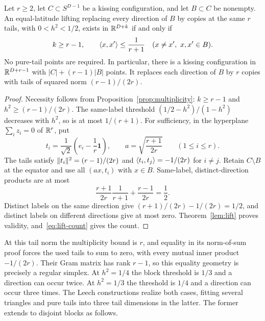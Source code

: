 \begin{proposition}\label{prop:simplex}
Let $r\ge2$, let $C\subset S^{D-1}$ be a kissing configuration, and
let $B\subset C$ be nonempty. An equal-latitude lifting replacing
every direction of $B$ by copies at the same $r$ tails, with
$0<h^2<1/2$, exists in $\mathbb R^{D+k}$ if and only if
\[
 k\ge r-1,\qquad
 \langle x,x'\rangle\le\frac1{r+1}\quad(x\ne x',\ x,x'\in B).
\]
No pure-tail points are required. In particular, there is a kissing
configuration in $\mathbb R^{D+r-1}$ with
$|C|+(r-1)|B|$ points. It replaces each direction of $B$ by $r$
copies with tails of squared norm $(r-1)/(2r)$.
\end{proposition}
\begin{proof}
Necessity follows from Proposition~\ref{prop:multiplicity}:
$k\ge r-1$ and $h^2\ge(r-1)/(2r)$. The same-label threshold
$(1/2-h^2)/(1-h^2)$ decreases with $h^2$, so is at most $1/(r+1)$.
For sufficiency, in the hyperplane $\sum_i z_i=0$ of $\mathbb R^r$, put
\[
 t_i=\frac1{\sqrt2}\left(e_i-\frac1r\boldsymbol1\right),
 \qquad a=\sqrt{\frac{r+1}{2r}}\qquad(1\le i\le r).
\]
The tails satisfy $\lVert t_i\rVert^2=(r-1)/(2r)$ and
$\langle t_i,t_j\rangle=-1/(2r)$ for $i\ne j$. Retain $C\setminus B$
at the equator and use all $(ax,t_i)$ with $x\in B$.
Same-label, distinct-direction products are at most
\[
 \frac{r+1}{2r}\frac1{r+1}+\frac{r-1}{2r}=\frac12.
\]
Distinct labels on the same direction give
$(r+1)/(2r)-1/(2r)=1/2$, and distinct labels on different
directions give at most zero. Theorem~\ref{lem:lift} proves
validity, and~\eqref{eq:lift-count} gives the count.
\end{proof}

At this tail norm the multiplicity bound is $r$, and equality in
its norm-of-sum proof forces the used tails to sum to zero, with
every mutual inner product $-1/(2r)$. Their Gram matrix has rank
$r-1$, so this equality geometry is precisely a regular simplex.
At $h^2=1/4$ the block threshold is $1/3$ and a direction can occur
twice. At $h^2=1/3$ the threshold is $1/4$ and a direction can occur
three times. The Leech constructions realize both cases, fitting
several triangles and pure tails into three tail dimensions in the latter.
The former extends to disjoint blocks as follows.

